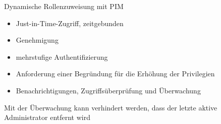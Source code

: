 \begin{flashcard}[Definition]{Dynamische Rollenzuweisung mit PIM}
  \begin{itemize}
    \item Just-in-Time-Zugriff, zeitgebunden
    \item Genehmigung
    \item mehrstufige Authentifizierung
    \item Anforderung einer Begründung für die Erhöhung der Privilegien
    \item Benachrichtigungen, Zugriffsüberprüfung und Überwachung
  \end{itemize}
  Mit der Überwachung kann verhindert werden, dass der letzte aktive Administrator entfernt wird
\end{flashcard}

